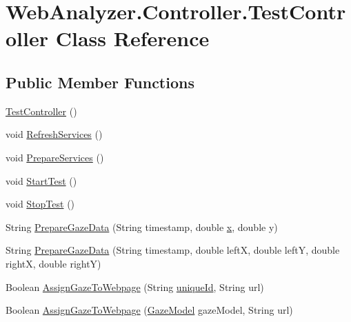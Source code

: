 \hypertarget{class_web_analyzer_1_1_controller_1_1_test_controller}{}\section{Web\+Analyzer.\+Controller.\+Test\+Controller Class Reference}
\label{class_web_analyzer_1_1_controller_1_1_test_controller}
\subsection*{Public Member Functions}
\begin{DoxyCompactItemize}
\item 
\hyperlink{class_web_analyzer_1_1_controller_1_1_test_controller_acac996dad8f9c1f9890263f82df9593a}{Test\+Controller} ()
\item 
void \hyperlink{class_web_analyzer_1_1_controller_1_1_test_controller_a7074ca580c48782cb944d4cde6bbe26e}{Refresh\+Services} ()
\item 
void \hyperlink{class_web_analyzer_1_1_controller_1_1_test_controller_afe606c22838435b0b471cea3157a1a3e}{Prepare\+Services} ()
\item 
void \hyperlink{class_web_analyzer_1_1_controller_1_1_test_controller_a2c41ced530712abfceaab3cea7f6bbac}{Start\+Test} ()
\item 
void \hyperlink{class_web_analyzer_1_1_controller_1_1_test_controller_a6ebdcf138dc6c394c8a5695da1f8de23}{Stop\+Test} ()
\item 
String \hyperlink{class_web_analyzer_1_1_controller_1_1_test_controller_af621c99b82c5589e2fa446fad6c0839e}{Prepare\+Gaze\+Data} (String timestamp, double \hyperlink{_u_i_2_h_t_m_l_resources_2js_2lib_2underscore_8min_8js_a81e910173af87b1161e719a504d52407}{x}, double y)
\item 
String \hyperlink{class_web_analyzer_1_1_controller_1_1_test_controller_accf7fa7b749594a749875738800679b9}{Prepare\+Gaze\+Data} (String timestamp, double left\+X, double left\+Y, double right\+X, double right\+Y)
\item 
Boolean \hyperlink{class_web_analyzer_1_1_controller_1_1_test_controller_a576aa4ab5c0fc2d7a10bcdbf2daaf1ef}{Assign\+Gaze\+To\+Webpage} (String \hyperlink{_u_i_2_h_t_m_l_resources_2js_2lib_2underscore_8min_8js_af690ff5521d79c7128861033ae80ae17}{unique\+Id}, String url)
\item 
Boolean \hyperlink{class_web_analyzer_1_1_controller_1_1_test_controller_aeffea7da4e0bf3400ebddc5440dc2def}{Assign\+Gaze\+To\+Webpage} (\hyperlink{class_web_analyzer_1_1_models_1_1_data_model_1_1_gaze_model}{Gaze\+Model} gaze\+Model, String url)

\end{DoxyCompactItemize}
